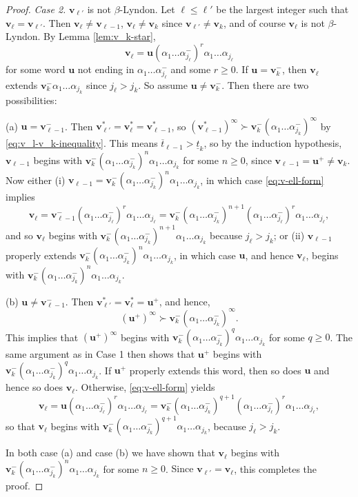 \documentclass[11pt]{amsart}
\theoremstyle{definition}
\theoremstyle{remark}
\numberwithin{equation}{section}
\renewcommand{\u}{\mathbf{u}}
\renewcommand{\v}{\mathbf{v}}
\newcommand{\f}{\infty}
\newcommand{\al}{\alpha}
\begin{document}
\begin{proof}
\medskip
{\em Case 2.} $\v_{\ell'}$ is not $\beta$-Lyndon. Let $\ell\leq \ell'$ be the largest integer such that $\v_{\ell}=\v_{\ell'}$.
Then $\v_{\ell}\neq \v_{\ell-1}$, $\v_{\ell}\neq \v_k$ since $\v_{\ell'}\neq \v_k$, and of course $\v_{\ell}$ is not $\beta$-Lyndon. By Lemma \ref{lem:v_k-star},
\begin{equation} \label{eq:v-ell-form}
\v_{\ell}=\u(\al_1\dots\al_{j_{\ell}}^-)^r\al_1\dots\al_{j_{\ell}}
\end{equation}
for some word $\u$ not ending in $\al_1\dots\al_{j_{\ell}}^-$ and some $r\geq 0$. If $\u=\v_k^-$, then $\v_\ell$ extends $\v_k^-\al_1\dots\al_{j_k}$ {since $j_\ell>j_k$}. So assume $\u\neq\v_k^-$. Then there are two possibilities:

(a) $\u=\v_{\ell-1}^-$. Then $\v_{\ell'}^*=\v_\ell^*=\v_{\ell-1}^*$, so $(\v_{\ell-1}^*)^\f \succ \v_k^-(\al_1\dots\al_{j_k}^-)^\f$ by \eqref{eq:v_l-v_k-inequality}. This means $\overline{t}_{\ell-1}>\underline{t}_k$, so by the induction hypothesis, $\v_{\ell-1}$ begins with $\v_k^-(\al_1\dots\al_{j_k}^-)^n\al_1\dots\al_{j_k}$ for some $n\geq 0$, since $\v_{\ell-1}=\u^+\neq \v_k$. Now either (i) $\v_{\ell-1}=\v_k^-(\al_1\dots\al_{j_k}^-)^n\al_1\dots\al_{j_k}$, in which case {\eqref{eq:v-ell-form} implies}
\[
\v_\ell=\v_{\ell-1}^-(\al_1\dots\al_{j_{\ell}}^-)^r\al_1\dots\al_{j_{\ell}}=\v_k^-(\al_1\dots\al_{j_k}^-)^{n+1}(\al_1\dots\al_{j_{\ell}}^-)^r\al_1\dots\al_{j_{\ell}},
\]
and so $\v_\ell$ begins with $\v_k^-(\al_1\dots\al_{j_k}^-)^{n+1}\al_1\dots\al_{j_k}$ because $j_\ell>j_k$; or (ii) $\v_{\ell-1}$ properly extends $\v_k^-(\al_1\dots\al_{j_k}^-)^n\al_1\dots\al_{j_k}$, in which case $\u$, and hence $\v_\ell$, begins with ${\v_k^-}(\al_1\dots\al_{j_k}^-)^n\al_1\dots\al_{j_k}$.

(b) $\u\neq\v_{\ell-1}^-$. Then $\v_{\ell'}^*=\v_\ell^*=\u^+$, and hence,
\[
(\u^+)^\f\succ \v_k^-(\al_1\dots\al_{j_k}^-)^\f.
\]
This implies that $(\u^+)^\f$ begins with $\v_k^-(\al_1\dots\al_{j_k}^-)^{q}\al_1\dots\al_{j_k}$ for some ${q}\geq 0$. The same argument as in Case 1 then shows that $\u^+$ {begins with} $\v_k^-(\al_1\dots\al_{j_k}^-)^{q}\al_1\dots\al_{j_k}$. If $\u^+$ properly extends this word, then so does $\u$ and hence so does $\v_\ell$.
Otherwise, {\eqref{eq:v-ell-form} yields
\[
\v_\ell=\u(\al_1\dots\al_{j_{\ell}}^-)^r\al_1\dots\al_{j_\ell}=\v_k^-(\al_1\dots\al_{j_k}^-)^{q+1}(\al_1\dots\al_{j_{\ell}}^-)^r\al_1\dots\al_{j_\ell},
\]
}
so that $\v_\ell$ {begins with} $\v_k^-(\al_1\dots\al_{j_k}^-)^{{q}+1}\al_1\dots\al_{j_k}$, because $j_\ell>j_k$.

In both case (a) and case (b) we have shown that $\v_\ell$ {begins with} $\v_k^-(\al_1\dots\al_{j_k}^-)^n\al_1\dots\al_{j_k}$ for some $n\geq 0$. {Since $\v_{\ell'}=\v_\ell$}, this completes the proof.
\end{proof}
 
\end{document}
